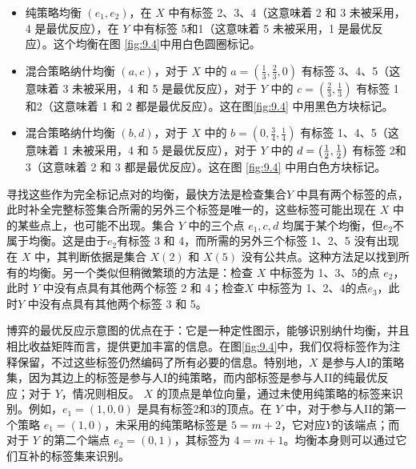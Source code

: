 \begin{itemize}
\item 纯策略均衡 \(\left( {{e}_{1},{e}_{2}}\right)\)，在 \(X\) 中有标签 2、3、4（这意味着 2 和 3 未被采用，4 是最优反应），在 \(Y\) 中有标签 5和1（这意味着 5 未被采用，1 是最优反应）。这个均衡在图 \ref{fig:9.4}中用白色圆圈标记。

\item 混合策略纳什均衡 $(a, c)$，对于 \(X\) 中的 \(a = \left( {\frac{1}{3},\frac{2}{3},0}\right)\) 有标签 3、4、5（这意味着 3 未被采用，4 和 5 是最优反应），对于 \(Y\) 中的 \(c = \left( {\frac{2}{3},\frac{1}{3}}\right)\) 有标签 1和2（这意味着 1 和 2 都是最优反应）。这在图\ref{fig:9.4} 中用黑色方块标记。

\item 混合策略纳什均衡 $(b, d)$，对于 \(X\) 中的 \(b = \left( {0,\frac{3}{4},\frac{1}{4}}\right)\) 有标签 1、4、5（这意味着 1 未被采用，4 和 5 是最优反应），对于 \(Y\) 中的 \({\color{red}d} = \left( {\frac{1}{2},\frac{1}{2}}\right)\) 有标签 2和3（这意味着 2 和 3 都是最优反应）。这在图 \ref{fig:9.4} 中用白色方块标记。  %
\end{itemize}


寻找这些作为完全标记点对的均衡，最快方法是检查集合\(Y\) 中具有两个标签的点，此时补全完整标签集合所需的另外三个标签是唯一的，这些标签可能出现在 $X$ 中的某些点上，也可能不出现。集合  \(Y\) 中的三个点 \({e}_{1},c,d\) 均属于某个均衡，但\({e}_{2}\)不属于均衡。这是由于\({e}_{2}\)有标签 3 和 4，而所需的另外三个标签 1、2、5 没有出现在 \(X\) 中，其判断依据是集合 \(X\left( 2\right)\) 和 \(X\left( 5\right)\) 没有公共点。这种方法足以找到所有的均衡。另一个类似但稍微繁琐的方法是：检查 $X$ 中标签为 1、3、5的点 ${e}_{2}$，此时 $Y$ 中没有点具有其他两个标签 2 和 4；检查$X$ 中标签为 1、2、4的点${e}_{3}$，此时$Y$ 中没有点具有其他两个标签 3 和 5。

博弈的最优反应示意图的优点在于：它是一种定性图示，能够识别纳什均衡，并且相比收益矩阵而言，提供更加丰富的信息。在图\ref{fig:9.4}中，我们仅将标签作为注释保留，不过这些标签仍然编码了所有必要的信息。特别地，\(X\) 是参与人I的策略集，因为其边上的标签是参与人I的纯策略，而内部标签是参与人II的纯最优反应；对于 \(Y\)，情况则相反。 \(X\) 的顶点是单位向量，通过未使用纯策略的标签来识别。例如，\({e}_{1} = \left( {1,0,0}\right)\) 是具有标签2和3的顶点。在 \(Y\) 中，对于参与人II的第一个策略 \({e}_{1} = \left( {1,0}\right)\)，未采用的纯策略标签是 \(5 = m + 2\)，它对应\(Y\)的该端点；而对于 \(Y\) 的第二个端点 \({e}_{2} = \left( {0,1}\right)\)，其标签为 \(4 = m + 1\)。均衡本身则可以通过它们互补的标签集来识别。


